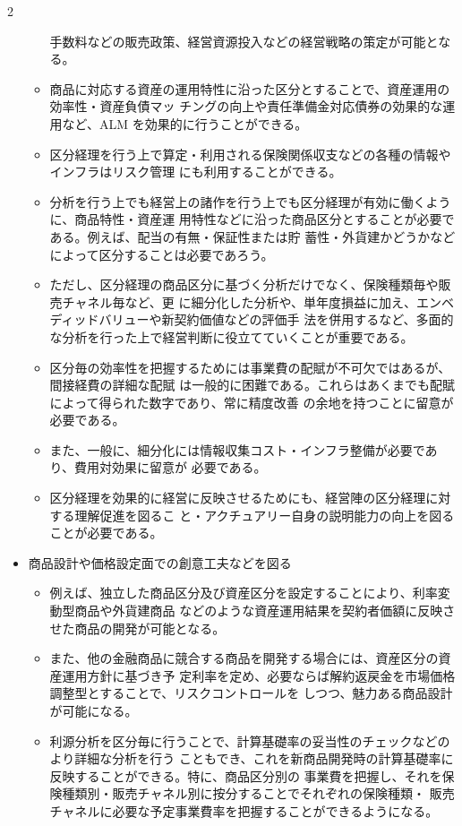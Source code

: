 2\documentclass[report,gutter=10mm,fore-edge=10mm,uplatex,dvipdfmx]{jlreq}
\begin{document}
\begin{itemize}
\begin{itemize}
 手数料などの販売政策、経営資源投入などの経営戦略の策定が可能となる。
\item[] 商品に対応する資産の運用特性に沿った区分とすることで、資産運用の効率性・資産負債マッ
 チングの向上や責任準備金対応債券の効果的な運用など、ALM を効果的に行うことができる。
\item[] 区分経理を行う上で算定・利用される保険関係収支などの各種の情報やインフラはリスク管理
 にも利用することができる。
\item[] 分析を行う上でも経営上の諸作を行う上でも区分経理が有効に働くように、商品特性・資産運
 用特性などに沿った商品区分とすることが必要である。例えば、配当の有無・保証性または貯
 蓄性・外貨建かどうかなどによって区分することは必要であろう。
\item[] ただし、区分経理の商品区分に基づく分析だけでなく、保険種類毎や販売チャネル毎など、更
 に細分化した分析や、単年度損益に加え、エンベディッドバリューや新契約価値などの評価手
 法を併用するなど、多面的な分析を行った上で経営判断に役立てていくことが重要である。
\item[] 区分毎の効率性を把握するためには事業費の配賦が不可欠ではあるが、間接経費の詳細な配賦
 は一般的に困難である。これらはあくまでも配賦によって得られた数字であり、常に精度改善
 の余地を持つことに留意が必要である。
\item[] また、一般に、細分化には情報収集コスト・インフラ整備が必要であり、費用対効果に留意が
 必要である。
\item[] 区分経理を効果的に経営に反映させるためにも、経営陣の区分経理に対する理解促進を図るこ
 と・アクチュアリー自身の説明能力の向上を図ることが必要である。
\end{itemize}
 \item[] 商品設計や価格設定面での創意工夫などを図る
\begin{itemize}
\item[] 例えば、独立した商品区分及び資産区分を設定することにより、利率変動型商品や外貨建商品
 などのような資産運用結果を契約者価額に反映させた商品の開発が可能となる。
\item[] また、他の金融商品に競合する商品を開発する場合には、資産区分の資産運用方針に基づき予
 定利率を定め、必要ならば解約返戻金を市場価格調整型とすることで、リスクコントロールを
 しつつ、魅力ある商品設計が可能になる。
\item[] 利源分析を区分毎に行うことで、計算基礎率の妥当性のチェックなどのより詳細な分析を行う
 こともでき、これを新商品開発時の計算基礎率に反映することができる。特に、商品区分別の
 事業費を把握し、それを保険種類別・販売チャネル別に按分することでそれぞれの保険種類・
 販売チャネルに必要な予定事業費率を把握することができるようになる。
\end{itemize}
\end{itemize}
\end{document}
